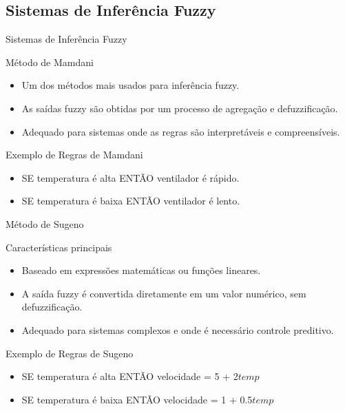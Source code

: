 \documentclass{beamer}
\begin{document}
\subsection{Sistemas de Inferência Fuzzy}
\begin{frame}{Sistemas de Inferência Fuzzy}
    \begin{block}{Método de Mamdani}

        \begin{itemize}
            \item Um dos métodos mais usados para inferência fuzzy.
            \item As saídas fuzzy são obtidas por um processo de agregação e defuzzificação.
            \item Adequado para sistemas onde as regras são interpretáveis e compreensíveis.
        \end{itemize}
    \end{block}
    \begin{block}{Exemplo de Regras de Mamdani}
        \begin{itemize}
            \item SE temperatura é alta ENTÃO ventilador é rápido.
            \item SE temperatura é baixa ENTÃO ventilador é lento.
        \end{itemize}
    \end{block}
\end{frame}

\begin{frame}{Método de Sugeno}
    \begin{block}{Características principais}

        \begin{itemize}
            \item Baseado em expressões matemáticas ou funções lineares.
            \item A saída fuzzy é convertida diretamente em um valor numérico, sem defuzzificação.
            \item Adequado para sistemas complexos e onde é necessário controle preditivo.
        \end{itemize}
    \end{block}
    \begin{block}{Exemplo de Regras de Sugeno}
        \begin{itemize}
            \item SE temperatura é alta ENTÃO velocidade = 5 + 2\(temp\)
            \item SE temperatura é baixa ENTÃO velocidade = 1 + 0.5\(temp\)
        \end{itemize}
    \end{block}
\end{frame}
\end{document}
